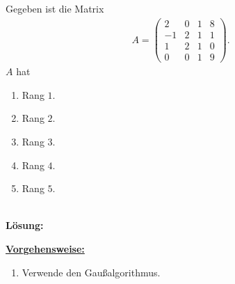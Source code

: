 \subsection*{}
Gegeben ist die Matrix
\begin{align*}
	A =
	\begin{pmatrix}
		2 & 0 & 1 & 8 \\
		-1 & 2 & 1 & 1 \\
		1 & 2 & 1 &  0 \\
		0 & 0 & 1 & 9
	\end{pmatrix}.
\end{align*}
$ A $ hat
\renewcommand{\labelenumi}{(\alph{enumi})}
\begin{enumerate}
	\item 
	Rang $ 1 $.
	\item 
	Rang $ 2 $.
	\item
	Rang $ 3 $.
	\item
	Rang $ 4 $.
	\item
	Rang $ 5 $.
\end{enumerate}
\ \\
\textbf{Lösung:}
\begin{mdframed}
\underline{\textbf{Vorgehensweise:}}
\renewcommand{\labelenumi}{\theenumi.}
\begin{enumerate}
\item Verwende den Gaußalgorithmus.
\end{enumerate}
\end{mdframed}

